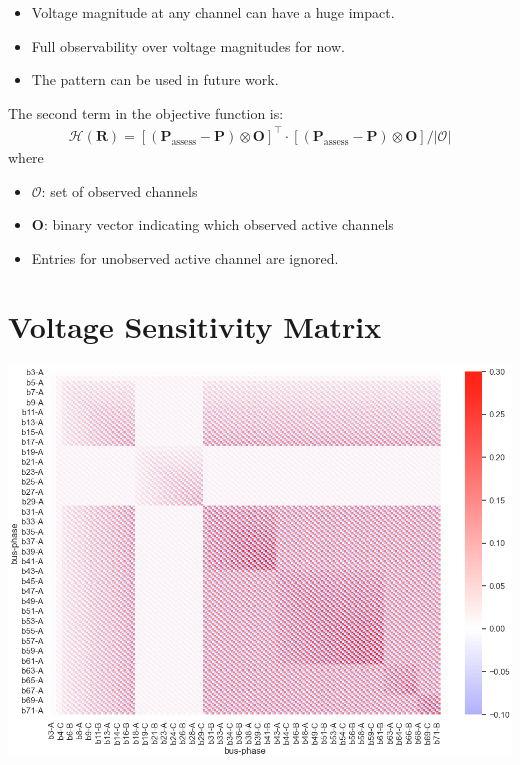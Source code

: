 \documentclass[
]{book}
\providecommand{\tightlist}{%
  \setlength{\itemsep}{0pt}\setlength{\parskip}{0pt}}
\begin{document}
\begin{itemize}
\tightlist
\item
  Voltage magnitude at any channel can have a huge impact.
\item
  Full observability over voltage magnitudes for now.
\item
  The pattern can be used in future work.
\end{itemize}

The second term in the objective function is:
\[ \begin{aligned}
  \mathcal{H}(\boldsymbol{R}) =
  \left[
    (\boldsymbol{P}_\text{assess} - \boldsymbol{P})
    \otimes \boldsymbol{O}
  \right]^\top
  \cdot \left[
    (\boldsymbol{P}_\text{assess} - \boldsymbol{P})
    \otimes \boldsymbol{O}
  \right]
  / |\mathcal{O}|
\end{aligned} \]
where

\begin{itemize}
\tightlist
\item
  \(\mathcal{O}\): set of observed channels
\item
  \(\boldsymbol{O}\): binary vector indicating which observed active channels
\item
  Entries for unobserved active channel are ignored.
\end{itemize}

\hypertarget{VSM}{%
\section{Voltage Sensitivity Matrix}\label{VSM}}

\begin{center}\includegraphics{Pictures/figHeatmapVSM} \end{center}
\end{document}
